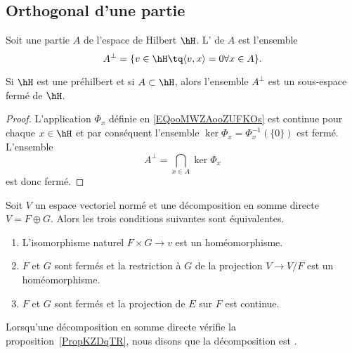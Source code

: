 \subsection{Orthogonal d'une partie}

\begin{definition}  \label{DEFooXUXQooMmDnhW}
	Soit une partie \( A\) de l'espace de Hilbert \( \hH\). L' de \( A\) est l'ensemble
	\begin{equation}
		A^{\perp}=\{ v\in\hH\tq \langle v, x\rangle =0\forall x\in A \}.
	\end{equation}
\end{definition}

\begin{proposition}     \label{PropdpaMpH}
	Si \( \hH\) est une préhilbert et si \( A\subset \hH\), alors l'ensemble \( A^{\perp}\) est un sous-espace fermé de \( \hH\).
\end{proposition}

\begin{proof}
	L'application \( \Phi_x\) définie en \eqref{EQooMWZAooZUFKOs} est continue pour chaque \( x\in\hH\) et par conséquent l'ensemble \( \ker\Phi_x=\Phi_x^{-1}(\{ 0 \})\) est fermé. L'ensemble
	\begin{equation}
		A^{\perp}=\bigcap_{x\in A}\ker\Phi_x
	\end{equation}
	est donc fermé.
\end{proof}

\begin{proposition}     \label{PropKZDqTR}
	Soit \( V\) un espace vectoriel normé et une décomposition en somme directe \( V=F\oplus G\). Alors les trois conditions suivantes sont équivalentes.
	\begin{enumerate}
		\item
		      L'isomorphisme naturel \( F\times G\to v\) est un homéomorphisme.
		\item
		      \( F\) et \( G\) sont fermés et la restriction à \( G\) de la projection \( V\to V/F\) est un homéomorphisme.
		\item
		      \( F\) et \( G\) sont fermés et la projection de \( E\) sur \( F\) est continue.
	\end{enumerate}
\end{proposition}
Lorsqu'une décomposition en somme directe vérifie la proposition~\ref{PropKZDqTR}, nous disons que la décomposition est .

